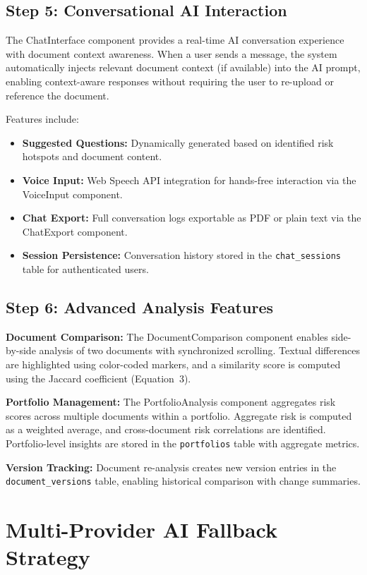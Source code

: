 \documentclass[12pt,a4paper,oneside]{report}
\begin{document}
\subsection{Step 5: Conversational AI Interaction}

The ChatInterface component provides a real-time AI conversation experience with document context awareness. When a user sends a message, the system automatically injects relevant document context (if available) into the AI prompt, enabling context-aware responses without requiring the user to re-upload or reference the document.

Features include:
\begin{itemize}[leftmargin=2cm]
  \item \textbf{Suggested Questions:} Dynamically generated based on identified risk hotspots and document content.
  \item \textbf{Voice Input:} Web Speech API integration for hands-free interaction via the VoiceInput component.
  \item \textbf{Chat Export:} Full conversation logs exportable as PDF or plain text via the ChatExport component.
  \item \textbf{Session Persistence:} Conversation history stored in the \texttt{chat\_sessions} table for authenticated users.
\end{itemize}

\subsection{Step 6: Advanced Analysis Features}

\textbf{Document Comparison:} The DocumentComparison component enables side-by-side analysis of two documents with synchronized scrolling. Textual differences are highlighted using color-coded markers, and a similarity score is computed using the Jaccard coefficient (Equation~3).

\textbf{Portfolio Management:} The PortfolioAnalysis component aggregates risk scores across multiple documents within a portfolio. Aggregate risk is computed as a weighted average, and cross-document risk correlations are identified. Portfolio-level insights are stored in the \texttt{portfolios} table with aggregate metrics.

\textbf{Version Tracking:} Document re-analysis creates new version entries in the \texttt{document\_versions} table, enabling historical comparison with change summaries.

\section{Multi-Provider AI Fallback Strategy}
\end{document}
